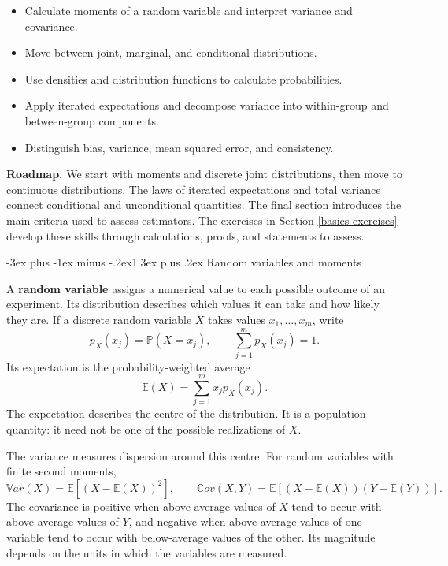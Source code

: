 \documentclass[
  11pt,
]{book}
\makeatletter
\providecommand{\tightlist}{%
  \setlength{\itemsep}{0pt}\setlength{\parskip}{0pt}}
\renewcommand\section{\@startsection{section}{1}{\z@}
  {-3ex plus -1ex minus -.2ex}{1.3ex plus .2ex}
  {\normalfont\Large\bfseries\color{TextbookInk}}}
\theoremstyle{definition}
\theoremstyle{definition}
\theoremstyle{definition}
\theoremstyle{definition}
\theoremstyle{remark}
\makeatother
\begin{document}
\begin{itemize}
\tightlist
\item
  Calculate moments of a random variable and interpret variance and covariance.
\item
  Move between joint, marginal, and conditional distributions.
\item
  Use densities and distribution functions to calculate probabilities.
\item
  Apply iterated expectations and decompose variance into within-group and between-group components.
\item
  Distinguish bias, variance, mean squared error, and consistency.
\end{itemize}

\textbf{Roadmap.} We start with moments and discrete joint distributions, then move to continuous distributions. The laws of iterated expectations and total variance connect conditional and unconditional quantities. The final section introduces the main criteria used to assess estimators. The exercises in Section \ref{basics-exercises} develop these skills through calculations, proofs, and statements to assess.

\section{Random variables and moments}\label{basics-moments}

A \textbf{random variable} assigns a numerical value to each possible outcome of an experiment. Its distribution describes which values it can take and how likely they are. If a discrete random variable \(X\) takes values \(x_1,\ldots,x_m\), write
\[
p_X(x_j)=\mathbb{P}(X=x_j),\qquad \sum_{j=1}^m p_X(x_j)=1.
\]
Its expectation is the probability-weighted average
\[
\mathbb{E}(X)=\sum_{j=1}^m x_jp_X(x_j).
\]
The expectation describes the centre of the distribution. It is a population quantity: it need not be one of the possible realizations of \(X\).

The variance measures dispersion around this centre. For random variables with finite second moments,
\[
\mathbb{V}ar(X)=\mathbb{E}[(X-\mathbb{E}(X))^2],\qquad
\mathbb{C}ov(X,Y)=\mathbb{E}[(X-\mathbb{E}(X))(Y-\mathbb{E}(Y))].
\]
The covariance is positive when above-average values of \(X\) tend to occur with above-average values of \(Y\), and negative when above-average values of one variable tend to occur with below-average values of the other. Its magnitude depends on the units in which the variables are measured.
\end{document}
